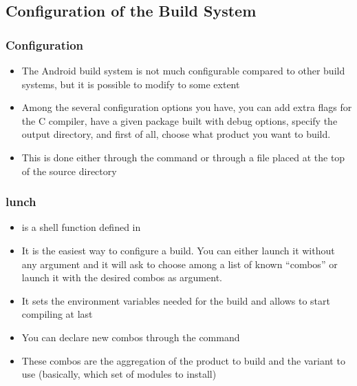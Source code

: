 \subsection{Configuration of the Build System}
\begin{frame}
  \frametitle{Configuration}
  \begin{itemize}
  \item The Android build system is not much configurable compared to
    other build systems, but it is possible to modify to some extent
  \item Among the several configuration options you have, you can add
    extra flags for the C compiler, have a given package built with
    debug options, specify the output directory, and first of all, choose what
    product you want to build.
  \item This is done either through the  command or
    through a  file placed at the top of the source
    directory
  \end{itemize}
\end{frame}

\begin{frame}
  \frametitle{lunch}
  \begin{itemize}
  \item {} is a shell function defined in 
  \item It is the easiest way to configure a build. You can either
    launch it without any argument and it will ask to choose among a list
    of known ``combos'' or launch it with the desired combos as argument.
  \item It sets the environment variables needed for the build and
    allows to start compiling at last
  \item You can declare new combos through the 
    command
  \item These combos are the aggregation of the product to build and
    the variant to use (basically, which set of modules to install)
  \end{itemize}
\end{frame}

